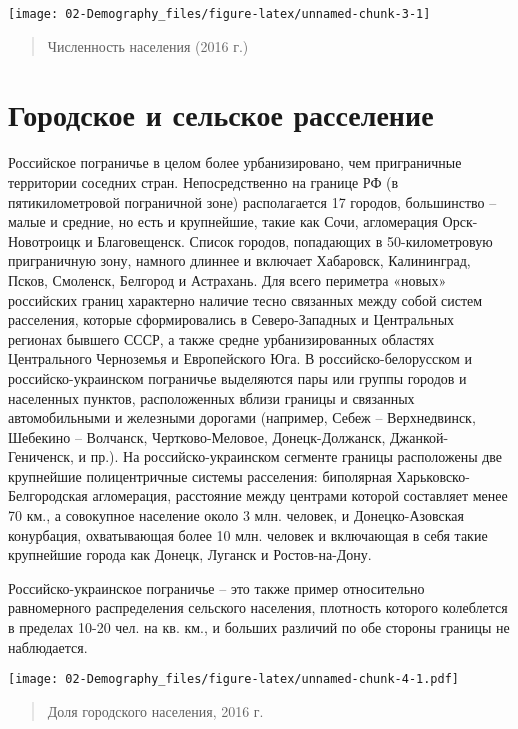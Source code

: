 \documentclass[]{book}
\begin{document}
\texttt{[image: 02-Demography\_files/figure-latex/unnamed-chunk-3-1]}

\begin{quote}
Численность населения (2016 г.)
\end{quote}

\section{Городское и сельское расселение}\label{demo-urban}

Российское пограничье в целом более урбанизировано, чем приграничные
территории соседних стран. Непосредственно на границе РФ (в
пятикилометровой пограничной зоне) располагается 17 городов, большинство
-- малые и средние, но есть и крупнейшие, такие как Сочи, агломерация
Орск-Новотроицк и Благовещенск. Список городов, попадающих в
50-километровую приграничную зону, намного длиннее и включает Хабаровск,
Калининград, Псков, Смоленск, Белгород и Астрахань. Для всего периметра
«новых» российских границ характерно наличие тесно связанных между собой
систем расселения, которые сформировались в Северо-Западных и
Центральных регионах бывшего СССР, а также средне урбанизированных
областях Центрального Черноземья и Европейского Юга. В
российско-белорусском и российско-украинском пограничье выделяются пары
или группы городов и населенных пунктов, расположенных вблизи границы и
связанных автомобильными и железными дорогами (например, Себеж --
Верхнедвинск, Шебекино -- Волчанск, Чертково-Меловое, Донецк-Должанск,
Джанкой-Гениченск, и пр.). На российско-украинском сегменте границы
расположены две крупнейшие полицентричные системы расселения: биполярная
Харьковско-Белгородская агломерация, расстояние между центрами которой
составляет менее 70 км., а совокупное население около 3 млн. человек, и
Донецко-Азовская конурбация, охватывающая более 10 млн. человек и
включающая в себя такие крупнейшие города как Донецк, Луганск и
Ростов-на-Дону.

Российско-украинское пограничье -- это также пример относительно
равномерного распределения сельского населения, плотность которого
колеблется в пределах 10-20 чел. на кв. км., и больших различий по обе
стороны границы не наблюдается.

\texttt{[image: 02-Demography\_files/figure-latex/unnamed-chunk-4-1.pdf]}

\begin{quote}
Доля городского населения, 2016 г.
\end{quote}
\end{document}
